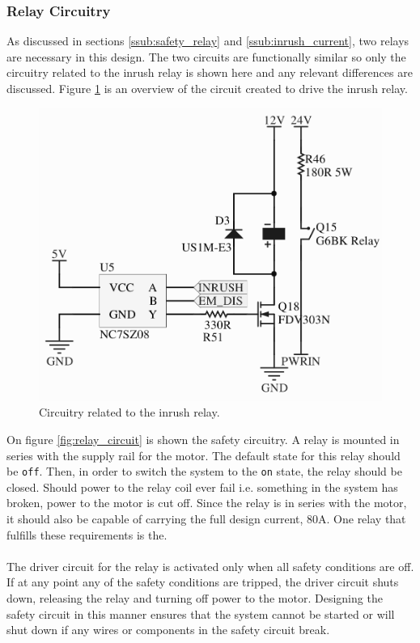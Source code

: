 \subsubsection{Relay Circuitry} %
\label{ssub:relay_circuitry}
As discussed in sections \ref{ssub:safety_relay} and \ref{ssub:inrush_current}, two relays are necessary in this design.
The two circuits are functionally similar so only the circuitry related to the inrush relay is shown here and any relevant differences are discussed.
Figure \ref{fig:relaycircuit} is an overview of the circuit created to drive the inrush relay.

\begin{figure}
	\centering
	\includegraphics[width=\linewidth]{graphics/relay_circuit}
	\caption{Circuitry related to the inrush relay.}
	\label{fig:relaycircuit}
\end{figure}


On figure \ref{fig:relay_circuit} is shown the safety circuitry.
A relay is mounted in series with the supply rail for the motor.
The default state for this relay should be \texttt{off}.
Then, in order to switch the system to the \texttt{on} state, the relay should be closed.
Should power to the relay coil ever fail i.e. something in the system has broken, power to the motor is cut off.
Since the relay is in series with the motor, it should also be capable of carrying the full design current, 80A.
One relay that fulfills these requirements is the.
\\~\\
The driver circuit for the relay is activated only when all safety conditions are off.
If at any point any of the safety conditions are tripped, the driver circuit shuts down, releasing the relay and turning off power to the motor.
Designing the safety circuit in this manner ensures that the system cannot be started or will shut down if any wires or components in the safety circuit break.


